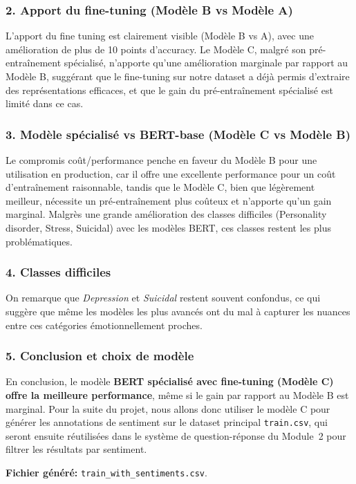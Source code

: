 \documentclass[12pt,a4paper]{report}
\begin{document}
\subsubsection{2. Apport du fine-tuning (Modèle B vs Modèle A)}
L'apport du fine tuning est clairement visible (Modèle B vs A), avec une amélioration de plus de 10 points d'accuracy.
Le Modèle C, malgré son pré-entraînement spécialisé, n'apporte qu'une amélioration marginale par rapport au Modèle B, 
suggérant que le fine-tuning sur notre dataset a déjà permis d'extraire des représentations efficaces, 
et que le gain du pré-entraînement spécialisé est limité dans ce cas.

\subsubsection{3. Modèle spécialisé vs BERT-base (Modèle C vs Modèle B)}
Le compromis coût/performance penche en faveur du Modèle B pour une utilisation en production,
car il offre une excellente performance pour un coût d'entraînement raisonnable, tandis que le Modèle C, bien que légèrement meilleur,
nécessite un pré-entraînement plus coûteux et n'apporte qu'un gain marginal.
Malgrès une grande amélioration des classes difficiles (Personality disorder, Stress, Suicidal) avec les modèles BERT,
ces classes restent les plus problématiques. 

\subsubsection{4. Classes difficiles}
On remarque que \textit{Depression} et \textit{Suicidal} restent souvent confondus, 
ce qui suggère que même les modèles les plus avancés ont du mal à capturer les nuances entre ces catégories émotionnellement proches.

\subsubsection{5. Conclusion et choix de modèle}
En conclusion, le modèle \textbf{BERT spécialisé avec fine-tuning (Modèle C) offre la meilleure performance}, même si le gain par rapport au Modèle B est marginal.
Pour la suite du projet, nous allons donc utiliser le modèle C pour générer les annotations de sentiment sur le dataset principal \texttt{train.csv}, 
qui seront ensuite réutilisées dans le système de question-réponse du Module~2 pour filtrer les résultats par sentiment.

\textbf{Fichier généré:} \texttt{train\_with\_sentiments.csv}.
\end{document}
